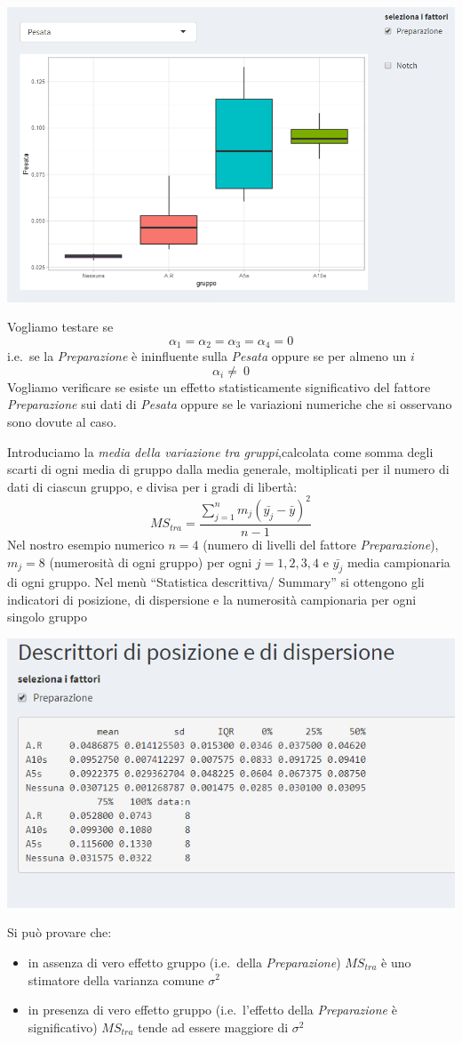 \documentclass[
  11pt,
]{book}
\providecommand{\tightlist}{%
  \setlength{\itemsep}{0pt}\setlength{\parskip}{0pt}}
\begin{document}
\begin{center}\includegraphics[width=0.5\linewidth]{Immagini/Anova/02_bp} \end{center}

Vogliamo testare se
\[
\alpha_1=\alpha_2=\alpha_3=\alpha_4=0
\]
i.e.~se la \emph{Preparazione} è ininfluente sulla \emph{Pesata} oppure se per almeno un \(i\)
\[
\alpha_i \neq \ 0
\]
Vogliamo verificare se esiste un effetto statisticamente significativo del fattore \emph{Preparazione} sui dati di \emph{Pesata} oppure se le variazioni numeriche che si osservano sono dovute al caso.

Introduciamo la \emph{media della variazione tra gruppi},calcolata come somma degli scarti di ogni media di gruppo dalla media generale, moltiplicati per il numero di dati di ciascun gruppo, e divisa per i gradi di libertà:
\[
MS_{tra}=\frac{\sum_{j=1}^nm_j(\bar{y_j}-\bar{y})^2}{n-1}
\]
Nel nostro esempio numerico \(n=4\) (numero di livelli del fattore \emph{Preparazione}), \(m_j=8\) (numerosità di ogni gruppo) per ogni \(j= 1, 2, 3, 4\) e \(\bar{y_j}\) media campionaria di ogni gruppo. Nel menù ``Statistica descrittiva/ Summary'' si ottengono gli indicatori di posizione, di dispersione e la numerosità campionaria per ogni singolo gruppo

\begin{center}\includegraphics[width=0.5\linewidth]{Immagini/Anova/03_summary} \end{center}

Si può provare che:

\begin{itemize}
\tightlist
\item
  in assenza di vero effetto gruppo (i.e.~della \emph{Preparazione}) \(MS_{tra}\) è uno stimatore della varianza comune \(\sigma^2\)
\item
  in presenza di vero effetto gruppo (i.e.~l'effetto della \emph{Preparazione} è significativo) \(MS_{tra}\) tende ad essere maggiore di \(\sigma^2\)
\end{itemize}
\end{document}
